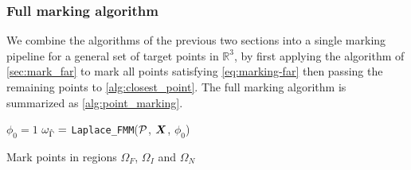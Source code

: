 
\subsubsection{Full marking algorithm}
We combine the algorithms of the previous two sections into a single marking pipeline for a general set of target points in $\mathbb{R}^3$, by first applying the algorithm of \cref{sec:mark_far} to mark all points satisfying  \cref{eq:marking-far} then passing the remaining points to \cref{alg:closest_point}.
The full marking algorithm is summarized as \cref{alg:point_marking}.

\begin{algorithm}
  
  \DontPrintSemicolon
  $\phi_0 = 1$\;
  $\omega_{\hat{\Gamma}} =$ \texttt{Laplace\_FMM}(${\mathcal{P}}$, ${\bm{X}}$, $\phi_0$)\;

   {Mark points in regions $\Omega_F$, $\Omega_I$ and $\Omega_N$}{}

\end{algorithm}



